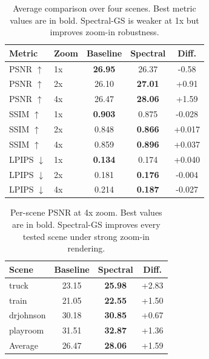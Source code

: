 \documentclass{article}
\begin{document}
\begin{table}[t]
\centering
\caption{Average comparison over four scenes. Best metric values are in bold. Spectral-GS is weaker at 1x but improves zoom-in robustness.}
\label{tab:avg}
\footnotesize
\begin{tabular}{llccc}
\hline
Metric & Zoom & Baseline & Spectral & Diff. \\
\hline
PSNR $\uparrow$ & 1x & \textbf{26.95} & 26.37 & -0.58 \\
PSNR $\uparrow$ & 2x & 26.10 & \textbf{27.01} & +0.91 \\
PSNR $\uparrow$ & 4x & 26.47 & \textbf{28.06} & +1.59 \\
SSIM $\uparrow$ & 1x & \textbf{0.903} & 0.875 & -0.028 \\
SSIM $\uparrow$ & 2x & 0.848 & \textbf{0.866} & +0.017 \\
SSIM $\uparrow$ & 4x & 0.859 & \textbf{0.896} & +0.037 \\
LPIPS $\downarrow$ & 1x & \textbf{0.134} & 0.174 & +0.040 \\
LPIPS $\downarrow$ & 2x & 0.181 & \textbf{0.176} & -0.004 \\
LPIPS $\downarrow$ & 4x & 0.214 & \textbf{0.187} & -0.027 \\
\hline
\end{tabular}
\end{table}

\begin{table}[t]
\centering
\caption{Per-scene PSNR at 4x zoom. Best values are in bold. Spectral-GS improves every tested scene under strong zoom-in rendering.}
\label{tab:zoom4}
\begin{tabular}{l|ccc}
\hline
Scene & Baseline & Spectral & Diff. \\
\hline
truck & 23.15 & \textbf{25.98} & +2.83 \\
train & 21.05 & \textbf{22.55} & +1.50 \\
drjohnson & 30.18 & \textbf{30.85} & +0.67 \\
playroom & 31.51 & \textbf{32.87} & +1.36 \\
\hline
Average & 26.47 & \textbf{28.06} & +1.59 \\
\hline
\end{tabular}
\end{table}
\end{document}
